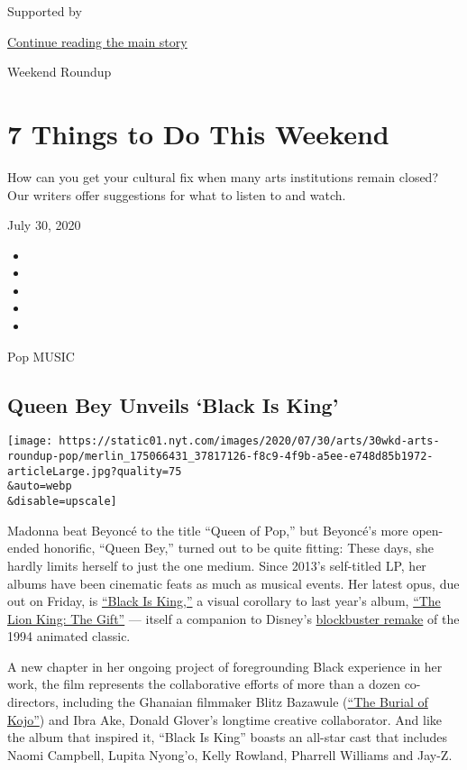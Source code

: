Supported by

\protect\hyperlink{after-sponsor}{Continue reading the main story}

Weekend Roundup

\hypertarget{7-things-to-do-this-weekend}{%
\section{7 Things to Do This
Weekend}\label{7-things-to-do-this-weekend}}

How can you get your cultural fix when many arts institutions remain
closed? Our writers offer suggestions for what to listen to and watch.

July 30, 2020

\begin{itemize}
\item
\item
\item
\item
\item
\end{itemize}

Pop MUSIC

\hypertarget{queen-bey-unveils-black-is-king}{%
\subsection{Queen Bey Unveils `Black Is
King'}\label{queen-bey-unveils-black-is-king}}

\texttt{[image: https://static01.nyt.com/images/2020/07/30/arts/30wkd-arts-roundup-pop/merlin\_175066431\_37817126-f8c9-4f9b-a5ee-e748d85b1972-articleLarge.jpg?quality=75\\\&auto=webp\\\&disable=upscale]}

Madonna beat Beyoncé to the title ``Queen of Pop,'' but Beyoncé's more
open-ended honorific, ``Queen Bey,'' turned out to be quite fitting:
These days, she hardly limits herself to just the one medium. Since
2013's self-titled LP, her albums have been cinematic feats as much as
musical events. Her latest opus, due out on Friday, is
\href{https://disneyplusoriginals.disney.com/movie/black-is-king}{``Black
Is King,''} a visual corollary to last year's album,
\href{https://www.youtube.com/watch?v=XnDdyeOaXy0\&list=OLAK5uy_nkj8U4dj1uSMUhZsAp0R3TpYH0xWvbcPc}{``The
Lion King: The Gift''} --- itself a companion to Disney's
\href{https://www.nytimes.com/2019/07/11/movies/the-lion-king-review.html}{blockbuster
remake} of the 1994 animated classic.

A new chapter in her ongoing project of foregrounding Black experience
in her work, the film represents the collaborative efforts of more than
a dozen co-directors, including the Ghanaian filmmaker Blitz Bazawule
(\href{https://www.nytimes.com/2019/03/28/movies/the-burial-of-kojo-review.html}{``The
Burial of Kojo''}) and Ibra Ake, Donald Glover's longtime creative
collaborator. And like the album that inspired it, ``Black Is King''
boasts an all-star cast that includes Naomi Campbell, Lupita Nyong'o,
Kelly Rowland, Pharrell Williams and Jay-Z.

